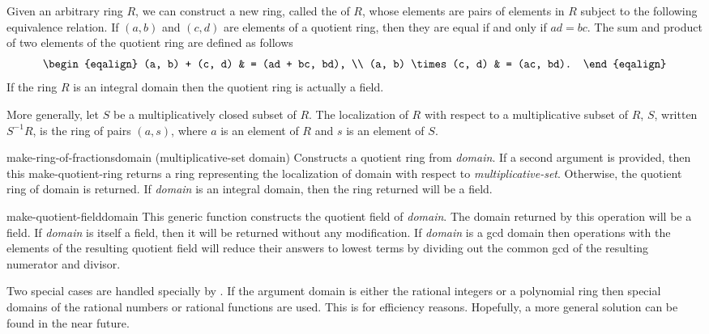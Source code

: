 Given an arbitrary ring $R$, we can construct a new ring, called the
 of $R$, whose elements are pairs of elements in
$R$ subject to the following equivalence relation. If $(a, b)$ and
$(c, d)$ are elements of a quotient ring, then they are equal if and
only if $ad = bc$. The sum and product of two elements of the quotient
ring are defined as follows
\[
\begin{eqalign}
(a, b) + (c, d) & = (ad + bc, bd), \\
(a, b) \times (c, d) & = (ac, bd).
\end{eqalign}
\]
If the ring $R$ is an integral domain then the quotient ring is
actually a field.

More generally, let $S$ be a multiplicatively closed subset of $R$. The
localization of $R$ with respect to a multiplicative subset of $R$, $S$,
written $S^{-1} R$, is the ring of pairs $(a, s)$, where $a$ is an
element of $R$ and $s$ is an element of $S$.
  
\begin{functiondef}{make-ring-of-fractions}{domain \optional
(multiplicative-set domain)}
Constructs a quotient ring from {\em domain}. If a second argument is
provided, then this {\sf make-quotient-ring} returns a ring
representing the localization of domain with respect to {\em
multiplicative-set}. Otherwise, the quotient ring of domain is
returned. If {\em domain} is an integral domain, then the ring returned will
be a field.
\end{functiondef}


\begin{functiondef}{make-quotient-field}{domain}
This generic function constructs the quotient field of {\em domain\/}.
The domain returned by this operation will be a field.  If {\em
domain} is itself a field, then it will be returned without any
modification.  If {\em domain} is a gcd domain then operations with
the elements of the resulting quotient field will reduce their answers
to lowest terms by dividing out the common gcd of the resulting
numerator and divisor.

\end{functiondef}

Two special cases are handled specially by .  If
the argument domain is either the rational integers or a polynomial
ring then special domains of the rational numbers or rational
functions are used.  This is for efficiency reasons.  Hopefully, a
more general solution can be found in the near future.

